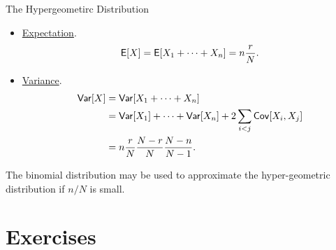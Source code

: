 \begin{frame}{The Hypergeometirc Distribution}

\justifying
\begin{itemize}
	\item \underline{Expectation}. 
	\begin{align*}
	\mathsf{E}[X] = \mathsf{E}[X_1 + \cdots + X_n] = n\frac{r}{N}.
	\end{align*}
	\item \underline{Variance}.
	\begin{align*}
	\mathsf{Var}[X] & = \mathsf{Var}[X_1 + \cdots + X_n] \\
	& = \mathsf{Var}[X_1] + \cdots + \mathsf{Var}[X_n] + 2\sum_{i<j}\mathsf{Cov}[X_i, X_j] \\
	& = n\frac{r}{N}\frac{N-r}{N}\frac{N-n}{N-1}.
	\end{align*}
\end{itemize}
The binomial distribution may be used to approximate the hyper-geometric distribution if $n/N$ is small.

\end{frame}


\section{Exercises}

